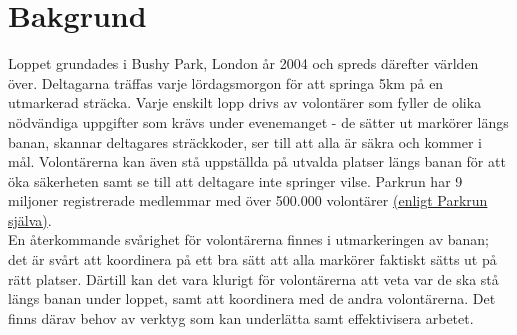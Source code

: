 \section{Bakgrund}






Loppet grundades i Bushy Park, London år 2004 och spreds därefter världen över. Deltagarna träffas varje lördagsmorgon för att springa 5km på en utmarkerad sträcka. Varje enskilt lopp drivs av volontärer som fyller de olika nödvändiga uppgifter som krävs under evenemanget - de sätter ut markörer längs banan, skannar deltagares sträckkoder, ser till att alla är säkra och kommer i mål. Volontärerna kan även stå uppställda på utvalda platser längs banan för att öka säkerheten samt se till att deltagare inte springer vilse. Parkrun har 9 miljoner registrerade medlemmar med över 500.000 volontärer \href{https://www.parkrun.com/about/}{(enligt Parkrun själva)}. \\
En återkommande svårighet för volontärerna finnes i utmarkeringen av banan; det är svårt att koordinera på ett bra sätt att alla markörer faktiskt sätts ut på rätt platser. Därtill kan det vara klurigt för volontärerna att veta var de ska stå längs banan under loppet, samt att koordinera med de andra volontärerna. Det finns därav behov av verktyg som kan underlätta samt effektivisera arbetet.

